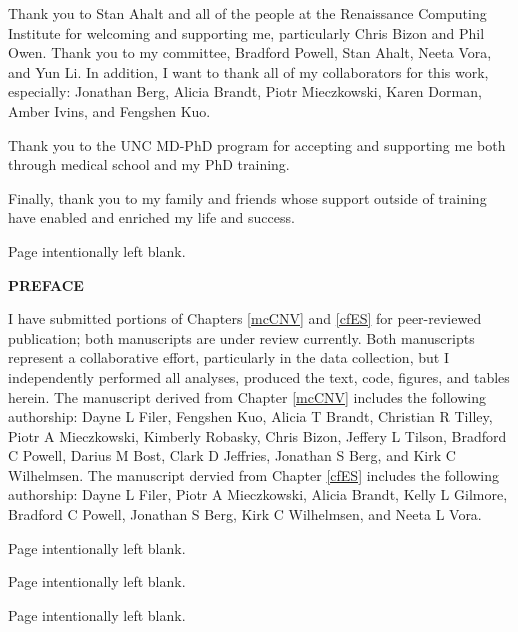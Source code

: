 \documentclass[11pt,letterpaper]{book}
\makeatletter
\newcommand*{\blankpage}{%
\vspace*{\fill}
{\centering Page intentionally left blank. \par}
\vspace{\fill}}
\renewcommand*{\cleardoublepage}{\clearpage\if@twoside \ifodd\c@page\else
\blankpage
\thispagestyle{empty}
\newpage
\if@twocolumn\hbox{}\newpage\fi\fi\fi}
\newcommand{\mytwoin}[1]{
\vspace*{0.6875in}
\begin{center}
\bfseries\Large\MakeUppercase{#1}
\end{center}
}
\makeatother
\begin{document}
  Thank you to Stan Ahalt and all of the people at the Renaissance Computing Institute for welcoming and supporting me, particularly Chris Bizon and Phil Owen.
  Thank you to my committee, Bradford Powell, Stan Ahalt, Neeta Vora, and Yun Li.
  In addition, I want to thank all of my collaborators for this work, especially: Jonathan Berg, Alicia Brandt, Piotr Mieczkowski, Karen Dorman, Amber Ivins, and Fengshen Kuo.
  
  Thank you to the UNC MD-PhD program for accepting and supporting me both through medical school and my PhD training.
  
  Finally, thank you to my family and friends whose support outside of training have enabled and enriched my life and success.

  \cleardoublepage
  \mytwoin{Preface}
  I have submitted portions of Chapters \ref{mcCNV} and \ref{cfES} for peer-reviewed publication; both manuscripts are under review currently.
  Both manuscripts represent a collaborative effort, particularly in the data collection, but I independently performed all analyses, produced the text, code, figures, and tables herein.
  The manuscript derived from Chapter \ref{mcCNV} includes the following authorship: Dayne L Filer, Fengshen Kuo, Alicia T Brandt, Christian R Tilley, Piotr A Mieczkowski, Kimberly Robasky, Chris Bizon, Jeffery L Tilson, Bradford C Powell, Darius M Bost, Clark D Jeffries, Jonathan S Berg, and Kirk C Wilhelmsen.
  The manuscript dervied from Chapter \ref{cfES} includes the following authorship: Dayne L Filer, Piotr A Mieczkowski, Alicia Brandt, Kelly L Gilmore, Bradford C Powell, Jonathan S Berg, Kirk C Wilhelmsen, and Neeta L Vora.

\clearpage

\tableofcontents
\cleardoublepage

\listoffigures
{}
\cleardoublepage

{}
\listoftables
\cleardoublepage
\end{document}
